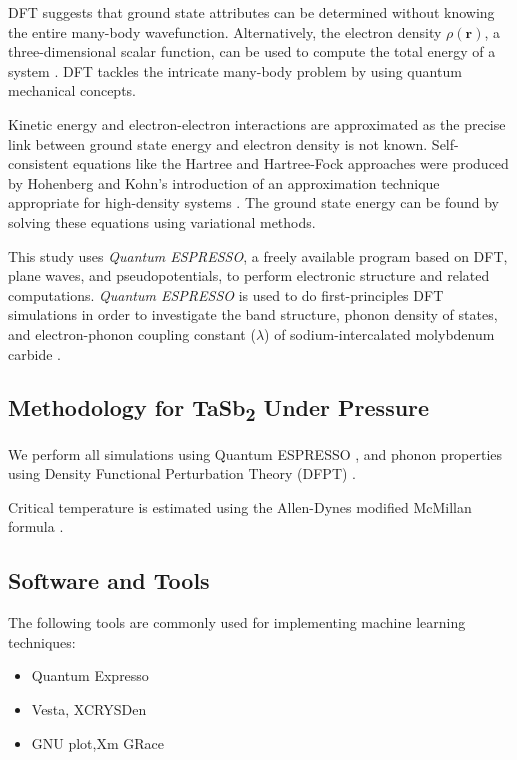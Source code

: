 \documentclass[12pt,a4paper]{article}
\begin{document}
DFT suggests that ground state attributes can be determined without knowing the entire many-body wavefunction. Alternatively, the electron density \( \rho(\mathbf{r}) \), a three-dimensional scalar function, can be used to compute the total energy of a system \cite{hohenberg1964inhomogeneous}. DFT tackles the intricate many-body problem by using quantum mechanical concepts. 

Kinetic energy and electron-electron interactions are approximated as the precise link between ground state energy and electron density is not known. Self-consistent equations like the Hartree and Hartree-Fock approaches were produced by Hohenberg and Kohn's introduction of an approximation technique appropriate for high-density systems \cite{hartree1928wave,fock1930naherungsmethode}. The ground state energy can be found by solving these equations using variational methods.

This study uses \textit{Quantum ESPRESSO}, a freely available program based on DFT, plane waves, and pseudopotentials, to perform electronic structure and related computations. \textit{Quantum ESPRESSO} is used to do first-principles DFT simulations in order to investigate the band structure, phonon density of states, and electron-phonon coupling constant (\( \lambda \)) of sodium-intercalated molybdenum carbide \cite{giannozzi2009quantum}.


\subsection{Methodology for TaSb\textsubscript{2} Under Pressure}

We perform all simulations using Quantum ESPRESSO \cite{giannozzi2009quantum}, and phonon properties using Density Functional Perturbation Theory (DFPT) \cite{baroni2001phonons}.

Critical temperature is estimated using the Allen-Dynes modified McMillan formula \cite{allen1975transition}.

\subsection{Software and Tools}
The following tools are commonly used for implementing machine learning techniques:

\begin{itemize}
    
    \item Quantum Expresso
    \item Vesta, XCRYSDen
    \item GNU plot,Xm GRace
    
\end{itemize}
\end{document}
